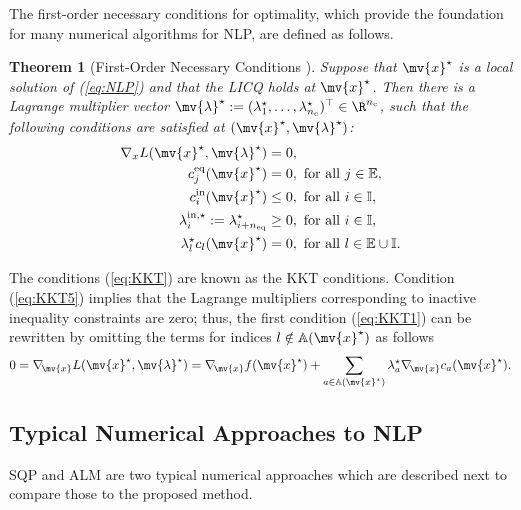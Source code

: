 \documentclass[journal]{IEEEtranTIE}
\newtheorem{theorem}{Theorem}
\begin{document}
The first-order necessary conditions for optimality, which provide the foundation for many numerical algorithms for NLP, are defined as follows.
\begin{theorem}[First-Order Necessary Conditions \cite{jorge2006numerical}] 
Suppose that $\mv{x}^\star$ is a local solution of (\ref{eq:NLP}) and that the LICQ holds at $\mv{x}^\star$. Then there is a Lagrange multiplier vector $\mv{\lambda}^\star := (\lambda_1^\star, \dots, \lambda_{n_{\rm c}}^\star)^\top \in \R^{n_{\rm c}}$, such that the following conditions are satisfied at $(\mv{x}^\star,\mv{\lambda}^\star)$:
\begin{subequations}\label{eq:KKT}
\begin{align}\label{eq:KKT1}
\nabla_x L(\mv{x}^\star,\mv{\lambda}^\star) = 0&,\\
c^{\rm eq}_j(\mv{x}^\star) = 0&,{\text{\ for\ all\ }}j \in \mathbb{E},\\\label{eq:KKT3}
c^{\rm in}_i(\mv{x}^\star) \leq 0&,{\text{\ for\ all\ }}i \in \mathbb{I},\\\label{eq:KKT4}
\lambda^{\rm in,\star}_i := \lambda_{i+n_{\rm eq}}^\star \geq 0&,{\text{\ for\ all\ }}i \in \mathbb{I},\\\label{eq:KKT5}
\lambda^\star_l{c_l}(\mv{x}^\star) = 0&,{\text{\ for\ all\ }} l \in \mathbb{E} \cup \mathbb{I}.
\end{align}
\end{subequations}
\end{theorem}
The conditions (\ref{eq:KKT}) are known as the KKT conditions.  %
Condition (\ref{eq:KKT5}) implies that the Lagrange multipliers corresponding to inactive inequality constraints are zero; thus, the first condition (\ref{eq:KKT1}) can be rewritten by omitting the terms for indices $l \notin \mathbb{A}(\mv{x}^\star)$ as follows
\begin{align}
0 = \nabla_{\!\mv{x}}L(\mv{x}^\star,\mv{\lambda}^\star) = \nabla_{\!\mv{x}} f(\mv{x}^\star) + \sum\limits_{a \in \mathbb{A}(\mv{x}^\star)} \lambda^\star_a \nabla_{\!\mv{x}} {c_a}(\mv{x}^\star).
\end{align}

\subsection{Typical Numerical Approaches to NLP}\label{subsec:Typ_NLP}

SQP and ALM are two typical numerical approaches which are described next to compare those to the proposed method. 
\end{document}
